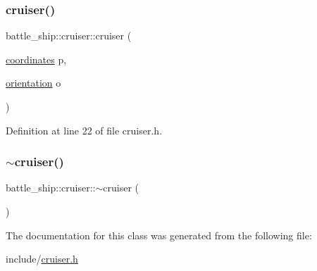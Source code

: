 \mbox{\label{classbattle__ship_1_1cruiser_a3460b4b49152a6653122e30224114115}} 
\subsubsection{\texorpdfstring{cruiser()}{cruiser()}\hspace{0.1cm}{\footnotesize\ttfamily [2/2]}}
{\footnotesize\ttfamily battle\+\_\+ship\+::cruiser\+::cruiser (\begin{DoxyParamCaption}\item[{\hyperlink{structbattle__ship_1_1coordinates}{coordinates}}]{p,  }\item[{\hyperlink{namespacebattle__ship_aed87488f0a73f0d0679fe343fb61c784}{orientation}}]{o }\end{DoxyParamCaption})\hspace{0.3cm}{\ttfamily [inline]}}



Definition at line 22 of file cruiser.\+h.

\mbox{\label{classbattle__ship_1_1cruiser_a78e3074b6331c963a2ba3200a14a85c3}} 
\subsubsection{\texorpdfstring{$\sim$cruiser()}{~cruiser()}}
{\footnotesize\ttfamily battle\+\_\+ship\+::cruiser\+::$\sim$cruiser (\begin{DoxyParamCaption}{ }\end{DoxyParamCaption})\hspace{0.3cm}{\ttfamily [default]}}



The documentation for this class was generated from the following file\+:\begin{DoxyCompactItemize}
\item 
include/\hyperlink{cruiser_8h}{cruiser.\+h}\end{DoxyCompactItemize}
